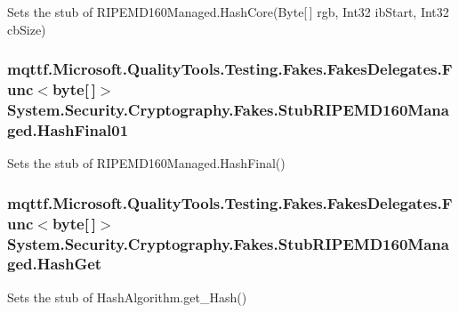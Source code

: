 Sets the stub of R\-I\-P\-E\-M\-D160\-Managed.\-Hash\-Core(\-Byte\mbox{[}$\,$\mbox{]} rgb, Int32 ib\-Start, Int32 cb\-Size)

\hypertarget{class_system_1_1_security_1_1_cryptography_1_1_fakes_1_1_stub_r_i_p_e_m_d160_managed_a578377ac439fb5f6f5143821670fc152}{
\subsubsection[{Hash\-Final01}]{\setlength{\rightskip}{0pt plus 5cm}mqttf.\-Microsoft.\-Quality\-Tools.\-Testing.\-Fakes.\-Fakes\-Delegates.\-Func$<$byte\mbox{[}$\,$\mbox{]}$>$ System.\-Security.\-Cryptography.\-Fakes.\-Stub\-R\-I\-P\-E\-M\-D160\-Managed.\-Hash\-Final01}}\label{class_system_1_1_security_1_1_cryptography_1_1_fakes_1_1_stub_r_i_p_e_m_d160_managed_a578377ac439fb5f6f5143821670fc152}


Sets the stub of R\-I\-P\-E\-M\-D160\-Managed.\-Hash\-Final()

\hypertarget{class_system_1_1_security_1_1_cryptography_1_1_fakes_1_1_stub_r_i_p_e_m_d160_managed_a4c4cf10ede97f0a0d59ccde0b7a7984f}{
\subsubsection[{Hash\-Get}]{\setlength{\rightskip}{0pt plus 5cm}mqttf.\-Microsoft.\-Quality\-Tools.\-Testing.\-Fakes.\-Fakes\-Delegates.\-Func$<$byte\mbox{[}$\,$\mbox{]}$>$ System.\-Security.\-Cryptography.\-Fakes.\-Stub\-R\-I\-P\-E\-M\-D160\-Managed.\-Hash\-Get}}\label{class_system_1_1_security_1_1_cryptography_1_1_fakes_1_1_stub_r_i_p_e_m_d160_managed_a4c4cf10ede97f0a0d59ccde0b7a7984f}


Sets the stub of Hash\-Algorithm.\-get\-\_\-\-Hash()

